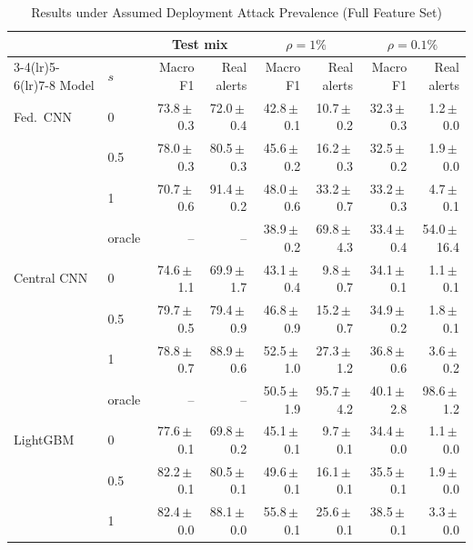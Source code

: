 \begin{table}[t]
\centering
\scriptsize
\caption{Results under Assumed Deployment Attack Prevalence (Full Feature Set)}
\label{tab:prevalence}
\setlength{\tabcolsep}{3pt}
\begin{tabular}{llrrrrrr}
\toprule
& & \multicolumn{2}{c}{Test mix} & \multicolumn{2}{c}{$\rho=1\%$} & \multicolumn{2}{c}{$\rho=0.1\%$} \\
\cmidrule(lr){3-4}\cmidrule(lr){5-6}\cmidrule(lr){7-8}
Model & $s$ & Macro F1 & Real alerts & Macro F1 & Real alerts & Macro F1 & Real alerts \\
\midrule
Fed.\ CNN & 0 & 73.8{\,}$\pm${\,}0.3 & 72.0{\,}$\pm${\,}0.4 & 42.8{\,}$\pm${\,}0.1 & 10.7{\,}$\pm${\,}0.2 & 32.3{\,}$\pm${\,}0.3 & 1.2{\,}$\pm${\,}0.0 \\
 & 0.5 & 78.0{\,}$\pm${\,}0.3 & 80.5{\,}$\pm${\,}0.3 & 45.6{\,}$\pm${\,}0.2 & 16.2{\,}$\pm${\,}0.3 & 32.5{\,}$\pm${\,}0.2 & 1.9{\,}$\pm${\,}0.0 \\
 & 1 & 70.7{\,}$\pm${\,}0.6 & 91.4{\,}$\pm${\,}0.2 & 48.0{\,}$\pm${\,}0.6 & 33.2{\,}$\pm${\,}0.7 & 33.2{\,}$\pm${\,}0.3 & 4.7{\,}$\pm${\,}0.1 \\
 & oracle & -- & -- & 38.9{\,}$\pm${\,}0.2 & 69.8{\,}$\pm${\,}4.3 & 33.4{\,}$\pm${\,}0.4 & 54.0{\,}$\pm${\,}16.4 \\
\midrule
Central CNN & 0 & 74.6{\,}$\pm${\,}1.1 & 69.9{\,}$\pm${\,}1.7 & 43.1{\,}$\pm${\,}0.4 & 9.8{\,}$\pm${\,}0.7 & 34.1{\,}$\pm${\,}0.1 & 1.1{\,}$\pm${\,}0.1 \\
 & 0.5 & 79.7{\,}$\pm${\,}0.5 & 79.4{\,}$\pm${\,}0.9 & 46.8{\,}$\pm${\,}0.9 & 15.2{\,}$\pm${\,}0.7 & 34.9{\,}$\pm${\,}0.2 & 1.8{\,}$\pm${\,}0.1 \\
 & 1 & 78.8{\,}$\pm${\,}0.7 & 88.9{\,}$\pm${\,}0.6 & 52.5{\,}$\pm${\,}1.0 & 27.3{\,}$\pm${\,}1.2 & 36.8{\,}$\pm${\,}0.6 & 3.6{\,}$\pm${\,}0.2 \\
 & oracle & -- & -- & 50.5{\,}$\pm${\,}1.9 & 95.7{\,}$\pm${\,}4.2 & 40.1{\,}$\pm${\,}2.8 & 98.6{\,}$\pm${\,}1.2 \\
\midrule
LightGBM & 0 & 77.6{\,}$\pm${\,}0.1 & 69.8{\,}$\pm${\,}0.2 & 45.1{\,}$\pm${\,}0.1 & 9.7{\,}$\pm${\,}0.1 & 34.4{\,}$\pm${\,}0.0 & 1.1{\,}$\pm${\,}0.0 \\
 & 0.5 & 82.2{\,}$\pm${\,}0.1 & 80.5{\,}$\pm${\,}0.1 & 49.6{\,}$\pm${\,}0.1 & 16.1{\,}$\pm${\,}0.1 & 35.5{\,}$\pm${\,}0.1 & 1.9{\,}$\pm${\,}0.0 \\
 & 1 & 82.4{\,}$\pm${\,}0.0 & 88.1{\,}$\pm${\,}0.0 & 55.8{\,}$\pm${\,}0.1 & 25.6{\,}$\pm${\,}0.1 & 38.5{\,}$\pm${\,}0.1 & 3.3{\,}$\pm${\,}0.0 \\

\end{tabular}
\end{table}
